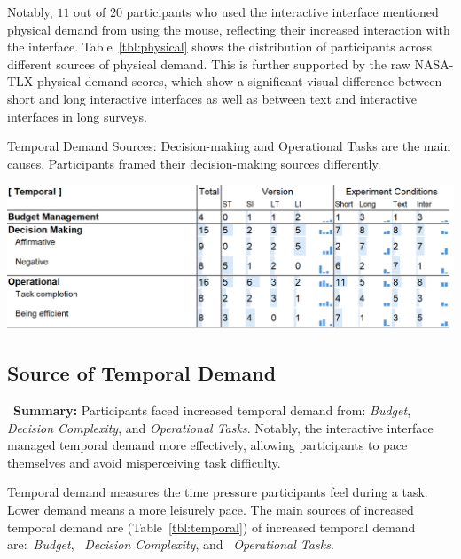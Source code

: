 Notably, $11$ out of $20$ participants who used the interactive interface mentioned physical demand from using the mouse, reflecting their increased interaction with the interface. Table~\ref{tbl:physical} shows the distribution of participants across different sources of physical demand. This is further supported by the raw NASA-TLX physical demand scores, which show a significant visual difference between short and long interactive interfaces as well as between text and interactive interfaces in long surveys.

\begin{table}[h]
    \caption{Temporal Demand Sources: Decision-making and Operational Tasks are the main causes. Participants framed their decision-making sources differently.}
    \label{tbl:temporal}
    \includegraphics[width=\linewidth]{content/image/cog/temporal_table.png}
\end{table}

\subsection{Source of Temporal Demand} 
\label{sec:temporal}
\vspace{5pt}

\begin{tldrbox}
    \faInfoCircle~\xspace\textbf{Summary:} Participants faced increased temporal demand from: \textit{Budget}, \textit{Decision Complexity}, and \textit{Operational Tasks}. Notably, the interactive interface managed temporal demand more effectively, allowing participants to pace themselves and avoid misperceiving task difficulty.
\end{tldrbox}

Temporal demand measures the time pressure participants feel during a task. Lower demand means a more leisurely pace. The main sources of increased temporal demand are (Table~\ref{tbl:temporal}) of increased temporal demand are:~\textit{Budget}, ~\textit{Decision Complexity}, and ~\textit{Operational Tasks}. 

